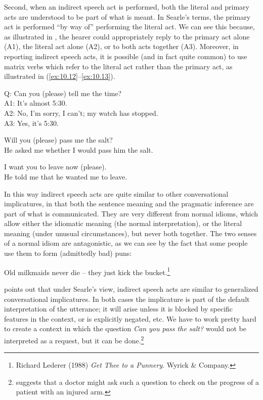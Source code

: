 Second, when an indirect speech act is performed, both the literal and primary acts are understood to be part of what is meant. In Searle’s terms, the primary act is performed “by way of” performing the literal act. We can see this because, as illustrated in , the hearer could appropriately reply to the primary act alone (A1), the literal act alone (A2), or to both acts together (A3). Moreover, in reporting indirect speech acts, it is possible (and in fact quite common) to use matrix verbs which refer to the literal act rather than the primary act, as illustrated in (\ref{ex:10.12}--\ref{ex:10.13}).

 
\ea \label{ex:10.11}
Q: Can you (please) tell me the time?\\
A1: It’s almost 5:30.\\
A2: No, I’m sorry, I can’t; my watch has stopped.\\
A3: Yes, it’s 5:30.
\z

\ea \label{ex:10.12}
\ea Will you (please) pass me the salt?\\
\ex He asked me whether I would pass him the salt.
                       \z
\z

\ea \label{ex:10.13}
\ea I want you to leave now (please).\\
\ex He told me that he wanted me to leave.
                       \z
\z


In this way indirect speech acts are quite similar to other conversational implicatures, in that both the sentence meaning and the pragmatic inference are part of what is communicated. They are very different from normal idioms, which allow either the idiomatic meaning (the normal interpretation), or the literal meaning (under unusual circumstances), but never both together. The two senses of a normal idiom are antagonistic, as we can see by the fact that some people use them to form (admittedly bad) puns:


\ea \label{ex:10.14}
Old milkmaids never die – they just kick the bucket.\footnote{Richard Lederer (1988) \textit{Get Thee to a Punnery}. Wyrick \& Company.}
\z


\citet[196]{Birner20122013} points out that under Searle’s view, indirect speech acts are similar to generalized conversational implicatures. In both cases the implicature is part of the default interpretation of the utterance; it will arise unless it is blocked by specific features in the context, or is explicitly negated, etc. We have to work pretty hard to create a context in which the question \textit{Can you pass the salt?} would not be interpreted as a request, but it can be done.\footnote{\citet[69]{Searle1975} suggests that a doctor might ask such a question to check on the progress of a patient with an injured arm.}



